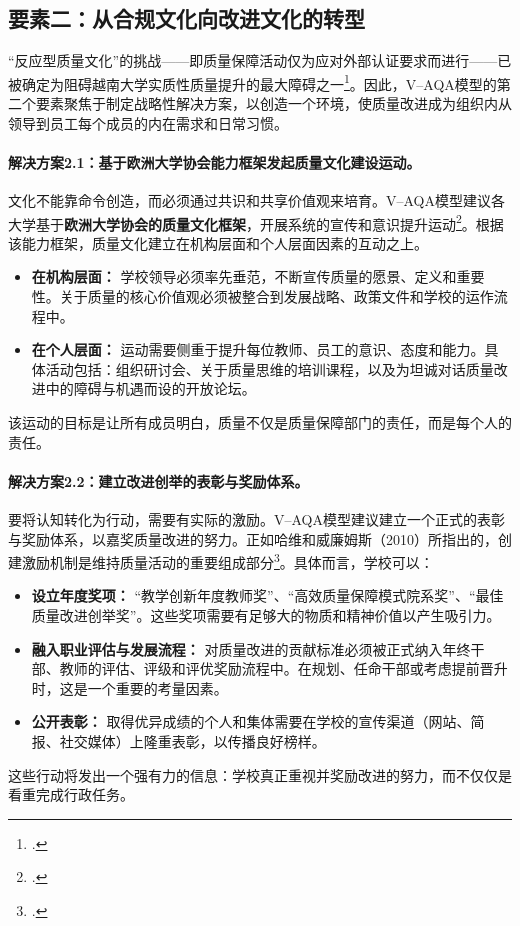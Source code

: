 \subsection{要素二：从合规文化向改进文化的转型}
\label{subsec:giaiphap_vanhoa}

“反应型质量文化”的挑战——即质量保障活动仅为应对外部认证要求而进行——已被确定为阻碍越南大学实质性质量提升的最大障碍之一\footcite{vjol_reactiveculture}。因此，V--AQA模型的第二个要素聚焦于制定战略性解决方案，以创造一个环境，使质量改进成为组织内从领导到员工每个成员的内在需求和日常习惯。

\paragraph{解决方案2.1：基于欧洲大学协会能力框架发起质量文化建设运动。}
文化不能靠命令创造，而必须通过共识和共享价值观来培育。V--AQA模型建议各大学基于\textbf{欧洲大学协会的质量文化框架}，开展系统的宣传和意识提升运动\footcite{eua_quality_culture}。根据该能力框架，质量文化建立在机构层面和个人层面因素的互动之上。
\begin{itemize}
    \item \textbf{在机构层面：} 学校领导必须率先垂范，不断宣传质量的愿景、定义和重要性。关于质量的核心价值观必须被整合到发展战略、政策文件和学校的运作流程中。
    \item \textbf{在个人层面：} 运动需要侧重于提升每位教师、员工的意识、态度和能力。具体活动包括：组织研讨会、关于质量思维的培训课程，以及为坦诚对话质量改进中的障碍与机遇而设的开放论坛。
\end{itemize}
该运动的目标是让所有成员明白，质量不仅是质量保障部门的责任，而是每个人的责任。

\paragraph{解决方案2.2：建立改进创举的表彰与奖励体系。}
要将认知转化为行动，需要有实际的激励。V--AQA模型建议建立一个正式的表彰与奖励体系，以嘉奖质量改进的努力。正如哈维和威廉姆斯（2010）所指出的，创建激励机制是维持质量活动的重要组成部分\footcite{harvey_williams_2010}。具体而言，学校可以：
\begin{itemize}
    \item \textbf{设立年度奖项：} “教学创新年度教师奖”、“高效质量保障模式院系奖”、“最佳质量改进创举奖”。这些奖项需要有足够大的物质和精神价值以产生吸引力。
    \item \textbf{融入职业评估与发展流程：} 对质量改进的贡献标准必须被正式纳入年终干部、教师的评估、评级和评优奖励流程中。在规划、任命干部或考虑提前晋升时，这是一个重要的考量因素。
    \item \textbf{公开表彰：} 取得优异成绩的个人和集体需要在学校的宣传渠道（网站、简报、社交媒体）上隆重表彰，以传播良好榜样。
\end{itemize}
这些行动将发出一个强有力的信息：学校真正重视并奖励改进的努力，而不仅仅是看重完成行政任务。

